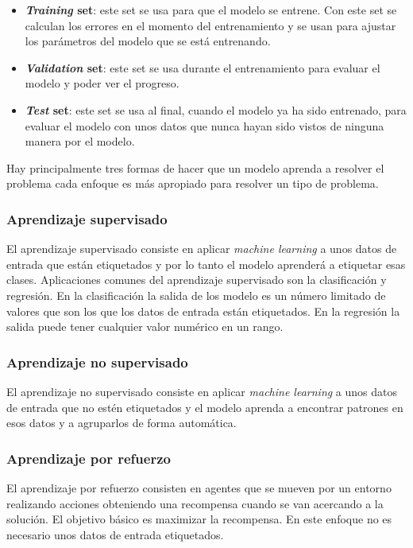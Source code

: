 \documentclass[12pt,a4paper]{article}
\begin{document}
\begin{itemize}
\item \textbf{\textit{Training} set}: este set se usa para que el modelo se entrene. Con este set se calculan los errores en el momento del entrenamiento y se usan para ajustar los parámetros del modelo que se está entrenando.
\item \textbf{\textit{Validation} set}: este set se usa durante el entrenamiento para evaluar el modelo y poder ver el progreso.
\item \textbf{\textit{Test} set}: este set se usa al final, cuando el modelo ya ha sido entrenado, para evaluar el modelo con unos datos que nunca hayan sido vistos de ninguna manera por el modelo.
\end{itemize}

Hay principalmente tres formas de hacer que un modelo aprenda \cite{wiki:ml} a resolver el problema cada enfoque es más apropiado para resolver un tipo de problema.

\subsubsection{Aprendizaje supervisado}
El aprendizaje supervisado consiste en aplicar \textit{machine learning} a unos datos de entrada que están etiquetados y por lo tanto el modelo aprenderá a etiquetar esas clases. Aplicaciones comunes del aprendizaje supervisado son la clasificación y regresión. En la clasificación la salida de los modelo es un número limitado de valores que son los que los datos de entrada están etiquetados. En la regresión la salida puede tener cualquier valor numérico en un rango.

\subsubsection{Aprendizaje no supervisado}
El aprendizaje no supervisado consiste en aplicar \textit{machine learning} a unos datos de entrada que no estén etiquetados y el modelo aprenda a encontrar patrones en esos datos y a agruparlos de forma automática.

\subsubsection{Aprendizaje por refuerzo}
El aprendizaje por refuerzo consisten en agentes que se mueven por un entorno realizando acciones obteniendo una recompensa cuando se van acercando a la solución. El objetivo básico es maximizar la recompensa. En este enfoque no es necesario unos datos de entrada etiquetados.
\end{document}
